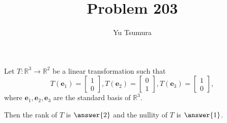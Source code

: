 \documentclass{ximera}
\title{Problem 203}
\author{Yu Tsumura}
\begin{document}
\begin{problem}

Let $T:\mathbb{R}^3 \to \mathbb{R}^2$ be a linear transformation such that
\[ T(\mathbf{e}_1)=\begin{bmatrix}
    1 \\
    0 
  \end{bmatrix}, T(\mathbf{e}_2)=\begin{bmatrix}
    0 \\
    1 
  \end{bmatrix}, T(\mathbf{e}_3)=\begin{bmatrix}
    1 \\
    0 
  \end{bmatrix},\]
where $\mathbf{e}_1, \mathbf{e}_2, \mathbf{e}_3$ are the standard basis of $\mathbb{R}^3$.

Then the rank of $T$ is $\answer{2}$ and the nullity of $T$ is $\answer{1}$.

\end{problem}

	  
	  	
\end{document}
